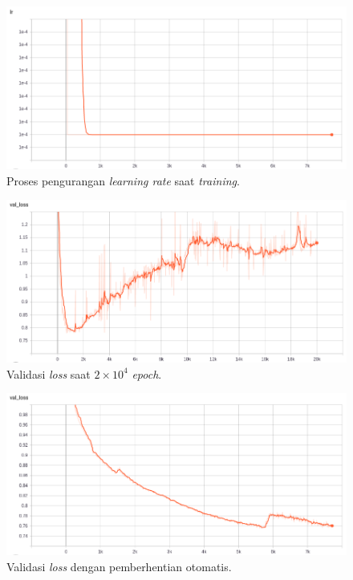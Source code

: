 \begin{figure} [!htb] \centering
	\includegraphics[scale=0.4]{img/callback_lr_chap3.png}
	\caption{Proses pengurangan \textit{learning rate} saat \textit{training}.}
	\label{fig:nn_dota2_lr}
\end{figure}

\begin{figure} [!htb] \centering
	\includegraphics[scale=0.4]{img/hyperparam_val_loss_chap3.png}
	\caption{Validasi \textit{loss} saat $2 \times 10^{4}$ \textit{epoch}.}
	\label{fig:nn_dota2_val_loss_20k}
\end{figure}

\begin{figure} [!htb] \centering
	\includegraphics[scale=0.4]{img/callback_val_loss_chap3.png}
	\caption{Validasi \textit{loss} dengan pemberhentian otomatis.}
	\label{fig:nn_dota2_val_loss_callback}
\end{figure}

